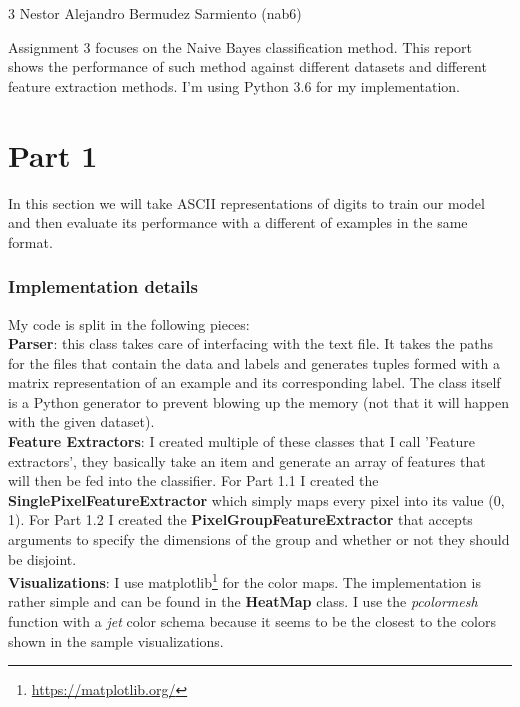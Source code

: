 \documentclass[11pt]{article}
\begin{document}
\homework
    {3}
    {Nestor Alejandro Bermudez Sarmiento (nab6)}
    {}

Assignment 3 focuses on the Naive Bayes classification method. This report shows the performance of such method against different datasets and different feature extraction methods. I'm using Python 3.6 for my implementation.

\section*{Part 1}

In this section we will take ASCII representations of digits to train our model and then evaluate its performance with a different of examples in the same format.

\subsubsection*{Implementation details}
My code is split in the following pieces:\\

\textbf{Parser}: this class takes care of interfacing with the text file. It takes the paths for the files that contain the data and labels and generates tuples formed with a matrix representation of an example and its corresponding label. The class itself is a Python generator to prevent blowing up the memory (not that it will happen with the given dataset).\\

\textbf{Feature Extractors}: I created multiple of these classes that I call 'Feature extractors', they basically take an item and generate an array of features that will then be fed into the classifier. For Part 1.1 I created the \textbf{SinglePixelFeatureExtractor} which simply maps every pixel into its value (0, 1). For Part 1.2 I created the \textbf{PixelGroupFeatureExtractor} that accepts arguments to specify the dimensions of the group and whether or not they should be disjoint.\\

\textbf{Visualizations}: I use matplotlib\footnote{\url{https://matplotlib.org/}} for the color maps. The implementation is rather simple and can be found in the \textbf{HeatMap} class. I use the \textit{pcolormesh} function with a \textit{jet} color schema because it seems to be the closest to the colors shown in the sample visualizations. \\
\end{document}

